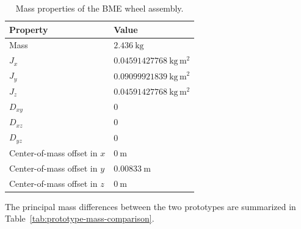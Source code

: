 \begin{table}[htbp]
  \centering
  \small
  \renewcommand{\arraystretch}{1.3}
  \caption{Mass properties of the BME wheel assembly.}
  \label{tab:bme-wheel-properties}
  \begin{tabular}{
    p{}
    p{}
  }
    \hline
    \textbf{Property}
    &
    \textbf{Value}
    \\
    \hline

    Mass
    &
    $2.436~\mathrm{kg}$
    \\

    $J_x$
    &
    $0.04591427768~\mathrm{kg\,m^2}$
    \\

    $J_y$
    &
    $0.09099921839~\mathrm{kg\,m^2}$
    \\

    $J_z$
    &
    $0.04591427768~\mathrm{kg\,m^2}$
    \\

    $D_{xy}$
    &
    $0$
    \\

    $D_{xz}$
    &
    $0$
    \\

    $D_{yz}$
    &
    $0$
    \\

    Center-of-mass offset in $x$
    &
    $0~\mathrm{m}$
    \\

    Center-of-mass offset in $y$
    &
    $0.00833~\mathrm{m}$
    \\

    Center-of-mass offset in $z$
    &
    $0~\mathrm{m}$
    \\

    \hline
  \end{tabular}
\end{table}

The principal mass differences between the two prototypes are summarized in Table~\ref{tab:prototype-mass-comparison}.

